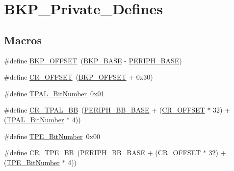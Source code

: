 \hypertarget{group___b_k_p___private___defines}{}\section{B\+K\+P\+\_\+\+Private\+\_\+\+Defines}
\label{group___b_k_p___private___defines}
\subsection*{Macros}
\begin{DoxyCompactItemize}
\item 
\#define \hyperlink{group___b_k_p___private___defines_gaaaf71f474657e7c0c5b0d6ba9697cf5d}{B\+K\+P\+\_\+\+O\+F\+F\+S\+ET}~(\hyperlink{openmotestm_2library_2inc_2stm32f10x__map_8h_aa15d5a9f40794105397ba5ea567c4ae1}{B\+K\+P\+\_\+\+B\+A\+SE} -\/ \hyperlink{openmotestm_2library_2inc_2stm32f10x__map_8h_a9171f49478fa86d932f89e78e73b88b0}{P\+E\+R\+I\+P\+H\+\_\+\+B\+A\+SE})
\item 
\#define \hyperlink{group___b_k_p___private___defines_gafa1d3d0ea72132df651c76fc1bdffffc}{C\+R\+\_\+\+O\+F\+F\+S\+ET}~(\hyperlink{openmotestm_2library_2src_2stm32f10x__bkp_8c_aaaf71f474657e7c0c5b0d6ba9697cf5d}{B\+K\+P\+\_\+\+O\+F\+F\+S\+ET} + 0x30)
\item 
\#define \hyperlink{group___b_k_p___private___defines_ga4af1869d665b8804104b6754c787820a}{T\+P\+A\+L\+\_\+\+Bit\+Number}~0x01
\item 
\#define \hyperlink{group___b_k_p___private___defines_gaa36e52f37b9fa6982bd224a6dcb86f78}{C\+R\+\_\+\+T\+P\+A\+L\+\_\+\+BB}~(\hyperlink{openmotestm_2library_2inc_2stm32f10x__map_8h_aed7efc100877000845c236ccdc9e144a}{P\+E\+R\+I\+P\+H\+\_\+\+B\+B\+\_\+\+B\+A\+SE} + (\hyperlink{openmotestm_2library_2src_2stm32f10x__rcc_8c_afa1d3d0ea72132df651c76fc1bdffffc}{C\+R\+\_\+\+O\+F\+F\+S\+ET} $\ast$ 32) + (\hyperlink{openmotestm_2library_2src_2stm32f10x__bkp_8c_a4af1869d665b8804104b6754c787820a}{T\+P\+A\+L\+\_\+\+Bit\+Number} $\ast$ 4))
\item 
\#define \hyperlink{group___b_k_p___private___defines_ga8c68be900246b028ff4af93ad119eb98}{T\+P\+E\+\_\+\+Bit\+Number}~0x00
\item 
\#define \hyperlink{group___b_k_p___private___defines_ga6c11e801c2c1aa87ec2feaefe12bbb96}{C\+R\+\_\+\+T\+P\+E\+\_\+\+BB}~(\hyperlink{openmotestm_2library_2inc_2stm32f10x__map_8h_aed7efc100877000845c236ccdc9e144a}{P\+E\+R\+I\+P\+H\+\_\+\+B\+B\+\_\+\+B\+A\+SE} + (\hyperlink{openmotestm_2library_2src_2stm32f10x__rcc_8c_afa1d3d0ea72132df651c76fc1bdffffc}{C\+R\+\_\+\+O\+F\+F\+S\+ET} $\ast$ 32) + (\hyperlink{openmotestm_2library_2src_2stm32f10x__bkp_8c_a8c68be900246b028ff4af93ad119eb98}{T\+P\+E\+\_\+\+Bit\+Number} $\ast$ 4))

\end{DoxyCompactItemize}
